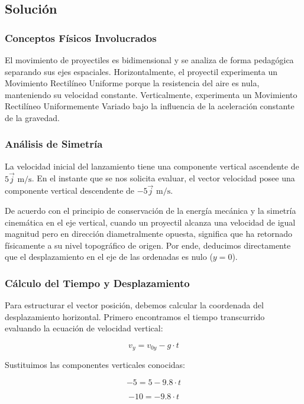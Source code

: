 \documentclass[12pt, a4paper]{article}
\begin{document}
\subsection*{Solución}

\subsubsection*{Conceptos Físicos Involucrados}

El movimiento de proyectiles es bidimensional y se analiza de forma pedagógica separando sus ejes espaciales. Horizontalmente, el proyectil experimenta un Movimiento Rectilíneo Uniforme porque la resistencia del aire es nula, manteniendo su velocidad constante. Verticalmente, experimenta un Movimiento Rectilíneo Uniformemente Variado bajo la influencia de la aceleración constante de la gravedad.

\subsubsection*{Análisis de Simetría}

La velocidad inicial del lanzamiento tiene una componente vertical ascendente de $5\vec{j} \text{ m/s}$. En el instante que se nos solicita evaluar, el vector velocidad posee una componente vertical descendente de $-5\vec{j} \text{ m/s}$. 

De acuerdo con el principio de conservación de la energía mecánica y la simetría cinemática en el eje vertical, cuando un proyectil alcanza una velocidad de igual magnitud pero en dirección diametralmente opuesta, significa que ha retornado físicamente a su nivel topográfico de origen. Por ende, deducimos directamente que el desplazamiento en el eje de las ordenadas es nulo ($y = 0$).

\subsubsection*{Cálculo del Tiempo y Desplazamiento}

Para estructurar el vector posición, debemos calcular la coordenada del desplazamiento horizontal. Primero encontramos el tiempo transcurrido evaluando la ecuación de velocidad vertical:

$$v_y = v_{0y} - g \cdot t$$

Sustituimos las componentes verticales conocidas:

$$-5 = 5 - 9.8 \cdot t$$

$$-10 = -9.8 \cdot t$$
\end{document}
